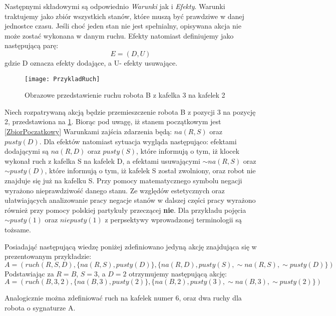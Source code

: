     Następnymi składowymi są odpowiednio \textit{Warunki} jak i \textit{Efekty}. Warunki traktujemy jako zbiór wszystkich stanów, które muszą być 
    prawdziwe w danej jednostce czasu. Jeśli choć jeden stan nie jest spełnialny, opisywana akcja nie może zostać wykonana w danym ruchu.
    Efekty natomiast definiujemy jako następującą parę:
    \begin{equation}
        E=(D,U)
    \end{equation}
    gdzie D oznacza efekty dodające, a U- efekty usuwające.
    \begin{figure}[H]
        \texttt{[image: PrzykladRuch]}
        \centering
        \caption{Obrazowe przedstawienie ruchu robota B z kafelka 3 na kafelek 2}
        \label{PrzykladRuch}
    \end{figure}
    Niech rozpatrywaną akcją będzie przemieszczenie robota B z pozycji 3 na pozycję 2,
    przedstawiona na \ref{PrzykladRuch}. Biorąc pod uwagę, iż stanem początkowym jest \ref{ZbiorPoczatkowy} Warunkami zajścia zdarzenia
    będą: $na(R,S)$ oraz $pusty(D)$. Dla efektów natomiast sytuacja wygląda następująco: efektami dodającymi są $na(R,D)$ oraz $pusty(S)$, które informują o tym, iż klocek 
    wykonał ruch z kafelka S na kafelek D, a efektami usuwającymi $\sim na(R,S)$ oraz $\sim pusty(D)$, które informują o tym, iż kafelek S został zwolniony, 
    oraz robot nie znajduje się już na kafelku S. Przy pomocy matematycznego symbolu negacji wyrażono nieprawdziwość danego stanu. Ze względów estetycznych 
    oraz ułatwiających analizowanie pracy negacje stanów w dalszej części pracy wyrażono również przy pomocy polskiej partykuły przeczącej \textbf{nie}. 
    Dla przykładu pojęcia $\sim pusty(1)$ oraz $niepusty(1)$ z perpsektywy wprowadzonej terminologii są tożsame. 

        Posiadająć następującą wiedzę poniżej zdefiniowano jedyną akcję znajdująca się w prezentowanym przykładzie:
    \begin{equation}
        \label{Ruch}
        A=(ruch(R,S,D),\{na(R,S),pusty(D)\},\{na(R,D),pusty(S),\sim na(R,S),\sim pusty(D)\})
    \end{equation}
    Podstawiając za $R=B$, $S=3$, a $D=2$ otrzymujemy następującą akcję:
    \begin{equation}
        A=(ruch(B,3,2),\{na(B,3),pusty(2)\},\{na(B,2),pusty(3),\sim na(B,3),\sim pusty(2)\})
    \end{equation}
    
    Analogicznie można zdefiniować ruch na kafelek numer 6, oraz dwa ruchy dla robota o sygnaturze A.


